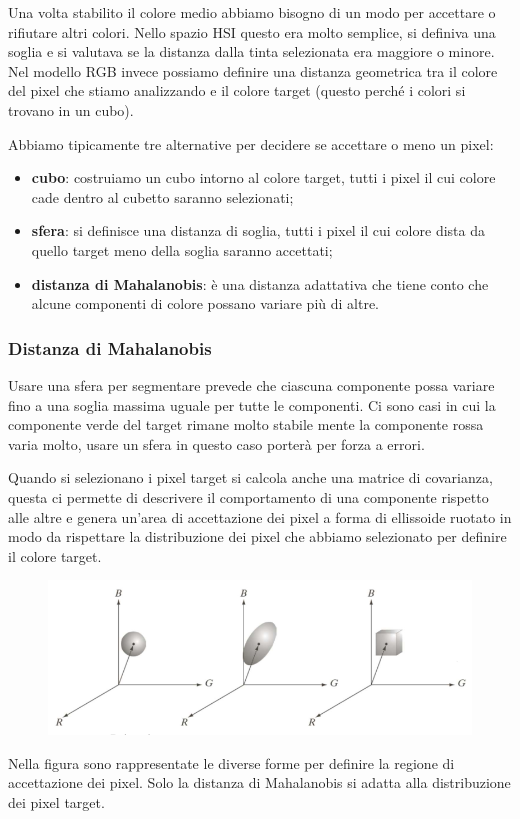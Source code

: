 Una volta stabilito il colore medio abbiamo bisogno di un modo per accettare o rifiutare altri colori. Nello spazio HSI questo era molto semplice, si definiva una soglia e si valutava se la distanza dalla tinta selezionata era maggiore o minore. Nel modello RGB invece possiamo definire una distanza geometrica tra il colore del pixel che stiamo analizzando e il colore target (questo perché i colori si trovano in un cubo).

Abbiamo tipicamente tre alternative per decidere se accettare o meno un pixel:
\begin{itemize}
	\item \textbf{cubo}: costruiamo un cubo intorno al colore target, tutti i pixel il cui colore cade dentro al cubetto saranno selezionati;
	\item \textbf{sfera}: si definisce una distanza di soglia, tutti i pixel il cui colore dista da quello target meno della soglia saranno accettati;
	\item \textbf{distanza di Mahalanobis}: è una distanza adattativa che tiene conto che alcune componenti di colore possano variare più di altre.
\end{itemize}

\subsubsection{Distanza di Mahalanobis}
Usare una sfera per segmentare prevede che ciascuna componente possa variare fino a una soglia massima uguale per tutte le componenti. Ci sono casi in cui la componente verde del target rimane molto stabile mente la componente rossa varia molto, usare un sfera in questo caso porterà per forza a errori.

Quando si selezionano i pixel target si calcola anche una matrice di covarianza, questa ci permette di descrivere il comportamento di una componente rispetto alle altre e genera un'area di accettazione dei pixel a forma di ellissoide ruotato in modo da rispettare la distribuzione dei pixel che abbiamo selezionato per definire il colore target.

\begin{figure}
	\centering
	\includegraphics[width=.95\linewidth]{Picture/Color_Slicing}
\end{figure}
Nella figura sono rappresentate le diverse forme per definire la regione di accettazione dei pixel. Solo la distanza di Mahalanobis si adatta alla distribuzione dei pixel target.